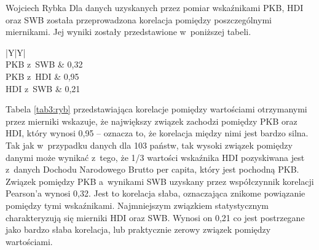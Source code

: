 \begin{artplenv}{Wojciech Rybka}
Dla danych uzyskanych przez pomiar wskaźnikami PKB, HDI oraz SWB została przeprowadzona korelacja pomiędzy
poszczególnymi miernikami. Jej wyniki zostały przedstawione w~poniższej tabeli. 

\captionsetup[table]{name=Tabela}
\begin{table}[H]
	\begin{tabularx}{\textwidth}{|Y|Y|}
		\hline
		\\\hline
		PKB z~SWB &
		0,32\\\hline
		PKB z~HDI &
		0,95\\\hline
		HDI z~SWB &
		0,21\\\hline
	\end{tabularx}
	
	\caption{Wartości związku pomiędzy poszczególnymi wskaźnikami dla Polski.
		Źródło: opracowanie własne na podstawie
		\parencite{international_monetary_fund_world_2019a,united_nations_development_programme_human_2019,noauthor_world_2018}.
		}
	\label{tab3:ryb}
\end{table}


%

Tabela \ref{tab3:ryb} przedstawiająca korelacje pomiędzy wartościami otrzymanymi przez mierniki wskazuje, że największy związek
zachodzi pomiędzy PKB oraz HDI, który wynosi 0,95 -- oznacza to, że korelacja między nimi jest bardzo silna. Tak
jak w~przypadku danych dla 103 państw, tak wysoki związek pomiędzy danymi może wynikać z~tego, że 1/3 wartości wskaźnika HDI
pozyskiwana jest z~danych Dochodu Narodowego Brutto per capita, który jest pochodną PKB. Związek pomiędzy
PKB a~wynikami SWB uzyskany przez współczynnik korelacji Pearson’a wynosi 0,32. Jest to korelacja słaba, oznaczająca znikome
powiązanie pomiędzy tymi wskaźnikami. Najmniejszym związkiem statystycznym charakteryzują się mierniki HDI oraz SWB.
Wynosi on 0,21 co jest postrzegane jako bardzo słaba korelacja, lub praktycznie zerowy związek pomiędzy wartościami. 


\end{artplenv}
